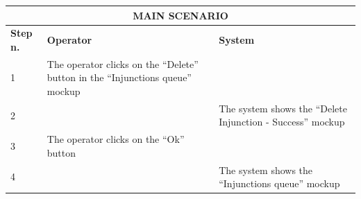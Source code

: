 {{{			\begin{table}[h]
			\begin{tabular}{|p{2cm}|p{6cm}|p{6cm}|}
			\hline
				\multicolumn{3}{|c|}{MAIN SCENARIO}\\
			\hline
				\centering \vspace{1mm} \bfseries{Step n.} \vspace{1mm} & \vspace{1mm} \bfseries{Operator} \vspace{1mm} & \vspace{1mm} \bfseries{System} \vspace{1mm}\\
			\hline
				\vspace{1mm} 1 \vspace{1mm} &
				\vspace{1mm} The operator clicks on the “Delete” button  in the “Injunctions queue” mockup\vspace{1mm} & 
				\vspace{1mm} \vspace{1mm} \\
			\hline
				\vspace{1mm} 2 \vspace{1mm} &
				\vspace{1mm} \vspace{1mm} & 
				\vspace{1mm} The system shows the “Delete Injunction - Success” mockup\vspace{1mm} \\
			\hline
				\vspace{1mm} 3 \vspace{1mm} &
				\vspace{1mm} The operator clicks on the “Ok”  button\vspace{1mm} & 
				\vspace{1mm} \vspace{1mm} \\
			\hline
				\vspace{1mm} 4 \vspace{1mm} &
				\vspace{1mm} \vspace{1mm} & 
				\vspace{1mm} The system shows the “Injunctions queue”  mockup\vspace{1mm} \\
			\hline
			\end{tabular}
			\end{table}
			
}}}
